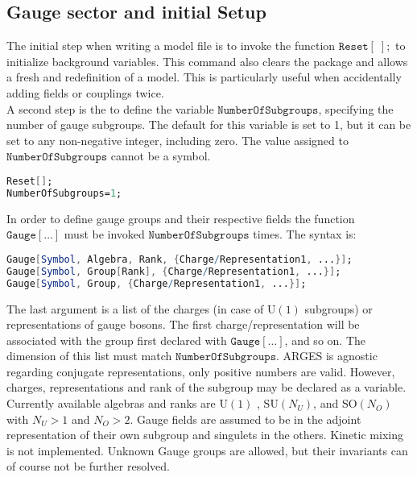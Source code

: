 \documentclass{scrartcl}
\begin{document}
\subsection{Gauge sector and initial Setup}
The initial step when writing a model file is to invoke the function $\mathtt{Reset[\;];}$ to initialize background variables. This command also clears the package and allows a fresh and redefinition of a model. This is particularly useful when accidentally adding fields or couplings twice. \\
A second step is the to define the variable $\mathtt{NumberOfSubgroups}$, specifying the number of gauge subgroups. The default for this variable is set to 1, but it can be set to any non-negative integer, including zero. The value assigned to $\mathtt{NumberOfSubgroups}$ cannot be a symbol.
\vspace{1em}
\begin{lstlisting}[language=mathematica,mathescape,columns=flexible,backgroundcolor=\color{light-gray}]
Reset[];
NumberOfSubgroups=1;
\end{lstlisting}
\vspace{1em}
In order to define gauge groups and their respective fields the function $\mathtt{Gauge[\dots]}$ must be invoked $\mathtt{NumberOfSubgroups}$ times. The syntax is:
\begin{lstlisting}[language=mathematica,mathescape,columns=flexible,backgroundcolor=\color{light-gray}]
Gauge[Symbol, Algebra, Rank, {Charge/Representation1, ...}];
Gauge[Symbol, Group[Rank], {Charge/Representation1, ...}];
Gauge[Symbol, Group, {Charge/Representation1, ...}];
\end{lstlisting}
The last argument is a list of the charges (in case of $\mathrm{U}(1)$ subgroups) or representations of gauge bosons. The first charge/representation will be associated with the group first declared with $\mathtt{Gauge[\dots]}$, and so on. The dimension of this list must match $\mathtt{NumberOfSubgroups}$. ARGES is agnostic regarding conjugate representations, only positive numbers are valid. However, charges, representations and rank of the subgroup may be declared as a variable. \newline Currently available algebras and ranks are $\mathrm{U}(1)$ , $\mathrm{SU}(N_U)$, and $\mathrm{SO}(N_O)$ with $N_U > 1$ and $N_O > 2$. Gauge fields are assumed to be in the adjoint representation of their own subgroup and singulets in the others. Kinetic mixing is not implemented. \newline Unknown Gauge groups are allowed, but their invariants can of course not be further resolved.
\FloatBarrier
\end{document}
